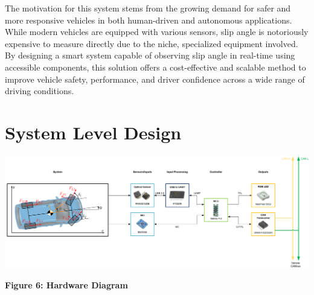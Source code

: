 \documentclass[12pt]{article}
\begin{document}
        The motivation for this system stems from the growing demand for safer and more responsive vehicles in both human-driven 
        and autonomous applications. While modern vehicles are equipped with various sensors, slip angle is notoriously expensive 
        to measure directly due to the niche, specialized equipment involved. By designing a smart system capable of observing slip 
        angle in real-time using accessible components, this solution offers a cost-effective and scalable method to improve vehicle 
        safety, performance, and driver confidence across a wide range of driving conditions. 

    \section{System Level Design}
        
        \begin{center}
            \vspace{0.5cm}

            \includegraphics[width=1\textwidth]{resources/Screenshot 2025-04-27 181552.png}

            \vspace{0.5cm}

            \textbf{Figure 6: Hardware Diagram}
            \label{hd}
        
        \end{center}





        
\end{document}
